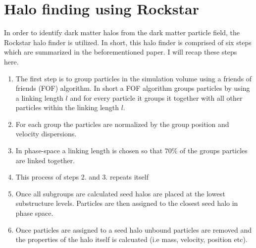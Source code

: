 \section{Halo finding using Rockstar}
In order to identify dark matter halos from the dark matter particle field, the Rockstar halo finder\cite{rockstar} is utilized. In short, this halo finder is comprised of six steps which are summarized in the beforementioned paper. I will recap these steps here.
\begin{enumerate}
    \item The first step is to group particles in the simulation volume using a friends of friends (FOF) algorithm. In short a FOF algorithm groups particles by using a linking length $l$ and for every particle it groups it together with all other particles within the linking length $l$.
    \item For each group the particles are normalized by the group position and velocity dispersions.
    \item In phase-space a linking length is chosen so that $70$\% of the groups particles are linked together.
    \item This process of steps 2. and 3. repeats itself
    \item Once all subgroups are calculated seed halos are placed at the lowest substructure levels. Particles are then assigned to the closest seed halo in phase space.
    \item Once particles are assigned to a seed halo unbound particles are removed and the properties of the halo itself is calcuated (i.e mass, velocity, position etc).
\end{enumerate}
